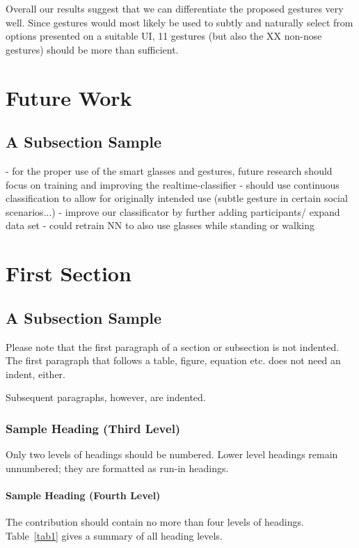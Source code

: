 \documentclass[runningheads]{llncs}
\begin{document}
Overall our results suggest that we can differentiate the proposed gestures very well. Since gestures would most likely be used to subtly and naturally select from options presented on a suitable UI, 11 gestures (but also the XX non-nose gestures) should be more than sufficient.

\section{Future Work}
\subsection{A Subsection Sample}
- for the proper use of the smart glasses and gestures, future research should focus on training and improving the realtime-classifier
   - should use continuous classification to allow for originally intended use (subtle gesture in certain social scenarios...)
- improve our classificator by further adding participants/ expand data set
- could retrain NN to also use glasses while standing or walking



\section{First Section}
\subsection{A Subsection Sample}
Please note that the first paragraph of a section or subsection is
not indented. The first paragraph that follows a table, figure,
equation etc. does not need an indent, either.

Subsequent paragraphs, however, are indented.

\subsubsection{Sample Heading (Third Level)} Only two levels of
headings should be numbered. Lower level headings remain unnumbered;
they are formatted as run-in headings.

\paragraph{Sample Heading (Fourth Level)}
The contribution should contain no more than four levels of
headings. Table~\ref{tab1} gives a summary of all heading levels.
\end{document}
